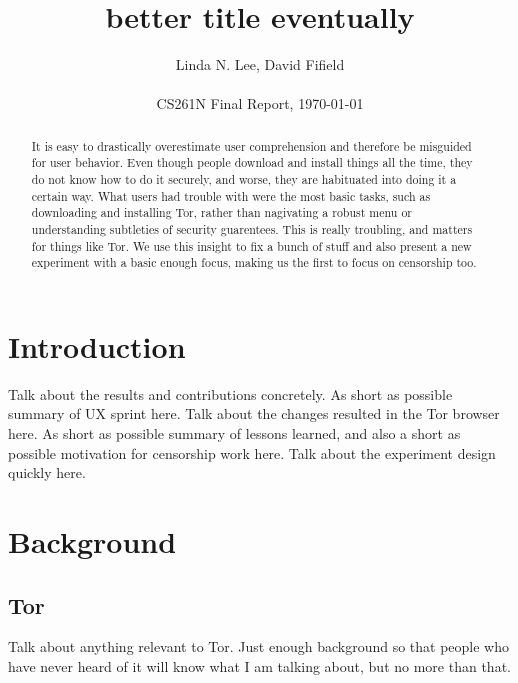 \documentclass{sig-alternate-hotpets15}
\begin{document}
\title{better title eventually}
\author{
 \alignauthor Linda N. Lee, David Fifield\\
    \\
   \vspace{0.5em}
   CS261N Final Report, \today
}
\maketitle

\begin{abstract}
It is easy to drastically overestimate user comprehension 
and therefore be misguided for user behavior. 
Even though people download and install things all the time, 
they do not know how to do it securely, and worse, 
they are habituated into doing it a certain way. 
What users had trouble with were the most basic tasks, 
such as downloading and installing Tor, rather than 
nagivating a robust menu or understanding subtleties of security guarentees. 
This is really troubling, and matters for things like Tor. 
We use this insight to fix a bunch of stuff and also 
present a new experiment with a basic enough focus, 
making us the first to focus on censorship too. 
\end{abstract}


\section{Introduction} %
Talk about the results and contributions concretely.
As short as possible summary of UX sprint here. %
Talk about the changes resulted in the Tor browser here.
As short as possible summary of lessons learned, 
and also a short as possible motivation for censorship work here. %
Talk about the experiment design quickly here. 

\section{Background}  %

\subsection{Tor} 
Talk about anything relevant to Tor. Just enough background so
that people who have never heard of it will know what I am talking
about, but no more than that. 
\end{document}
